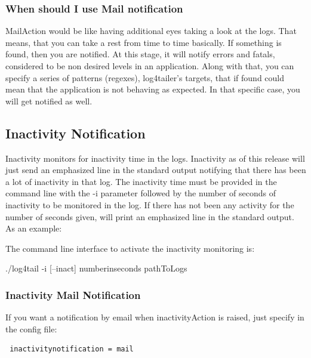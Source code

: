 \subsubsection{When should I use Mail notification}

MailAction would be like having additional eyes taking a look at the logs. That
means, that you can take a rest from time to time basically. If something is
found, then you are notified. At this stage, it will notify errors and fatals,
considered to be non desired levels in an application. Along with that, you can
specify a series of patterns (regexes), log4tailer's targets, that if found
could mean that the application is not behaving as expected. In that specific
case, you will get notified as well.
  
\subsection{Inactivity Notification}
\label{sec:inactivitysection}
Inactivity monitors for inactivity time in the logs. Inactivity as of this
release will just send an emphasized line in the standard output notifying that
there has been a lot of inactivity in that log. The inactivity time must be
provided in the command line with the -i parameter followed by the number of
seconds of inactivity to be monitored in the log.  If there has not been any
activity for the number of seconds given, \logftailer{} will print an
emphasized line in the standard output.\\ 
As an example:\\
 
The command line interface to activate the inactivity monitoring is:
\begin{cmd}
 ./log4tail -i [--inact] numberinseconds pathToLogs
\end{cmd}

\subsubsection{Inactivity Mail Notification}
If you want a notification by email when inactivityAction is raised, just specify in the 
config file:

\begin{config}
\begin{verbatim}
 inactivitynotification = mail
\end{verbatim}
\end{config}

